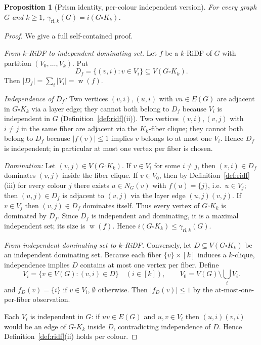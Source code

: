 \documentclass[11pt,a4paper]{article}
\theoremstyle{plain}
\newtheorem{proposition}[theorem]{Proposition}
\theoremstyle{definition}
\DeclareMathOperator{\weight}{w}
\newcommand{\gri}{\gamma_{\mathrm{ri},k}}
\newcommand{\cardK}{\square K_k}
\newcommand{\setK}{[k]}
\begin{document}
\begin{proposition}[Prism identity, per-colour independent version]\label{prop:identity}
For every graph $G$ and $k\ge 1$, $\gri(G)=i(G\cardK)$.
\end{proposition}
\begin{proof}
We give a full self-contained proof.

\textit{From $k$-RiDF to independent dominating set.}
Let $f$ be a $k$-RiDF of $G$ with partition $(V_{0},\dots,V_{k})$. Put
\[
D_{f}=\{(v,i): v\in V_{i}\}\subseteq V(G\cardK).
\]
Then $|D_{f}|=\sum_{i}|V_{i}|=\weight(f)$.

\emph{Independence of $D_{f}$:} Two vertices $(v,i),(u,i)$ with $vu\in E(G)$ are adjacent in $G\cardK$ via a layer edge; they cannot both belong to $D_{f}$ because $V_{i}$ is independent in $G$ (Definition~\ref{def:ridf}(ii)). Two vertices $(v,i),(v,j)$ with $i\neq j$ in the same fiber are adjacent via the $K_{k}$-fiber clique; they cannot both belong to $D_{f}$ because $|f(v)|\le1$ implies $v$ belongs to at most one $V_{i}$. Hence $D_{f}$ is independent; in particular at most one vertex per fiber is chosen.

\emph{Domination:} Let $(v,j)\in V(G\cardK)$. If $v\in V_{i}$ for some $i\neq j$, then $(v,i)\in D_{f}$ dominates $(v,j)$ inside the fiber clique. If $v\in V_{0}$, then by Definition~\ref{def:ridf}(iii) for every colour $j$ there exists $u\in N_{G}(v)$ with $f(u)=\{j\}$, i.e.\ $u\in V_{j}$; then $(u,j)\in D_{f}$ is adjacent to $(v,j)$ via the layer edge $(u,j)(v,j)$. If $v\in V_{j}$ then $(v,j)\in D_{f}$ dominates itself. Thus every vertex of $G\cardK$ is dominated by $D_{f}$. Since $D_{f}$ is independent and dominating, it is a maximal independent set; its size is $\weight(f)$. Hence $i(G\cardK)\le\gri(G)$.

\textit{From independent dominating set to $k$-RiDF.}
Conversely, let $D\subseteq V(G\cardK)$ be an independent dominating set. Because each fiber $\{v\}\times\setK$ induces a $k$-clique, independence implies $D$ contains at most one vertex per fiber. Define
\[
V_{i}=\{v\in V(G): (v,i)\in D\}\quad(i\in\setK),\qquad V_{0}=V(G)\setminus\bigcup_{i}V_{i}.
\]
and $f_{D}(v)=\{i\}$ if $v\in V_{i}$, $\emptyset$ otherwise. Then $|f_{D}(v)|\le1$ by the at-most-one-per-fiber observation.

Each $V_{i}$ is independent in $G$: if $uv\in E(G)$ and $u,v\in V_{i}$ then $(u,i)(v,i)$ would be an edge of $G\cardK$ inside $D$, contradicting independence of $D$. Hence Definition~\ref{def:ridf}(ii) holds per colour.


\end{proof}
\end{document}
